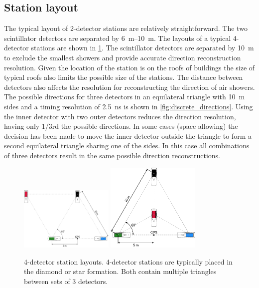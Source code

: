 \subsection{Station layout}
\label{sec:station_layout}

The typical layout of 2-detector stations are relatively straightforward. The two scintillator detectors are separated by \SIrange{6}{10}{\meter}. The layouts of a typical 4-detector stations are shown in \cref{fig:4_detector_layouts}. The scintillator detectors are separated by \SI{10}{\meter} to exclude the smallest showers and provide accurate direction reconstruction resolution. Given the location of the station is on the roofs of buildings the size of typical roofs also limits the possible size of the stations. The distance between detectors also affects the resolution for reconstructing the direction of air showers. The possible directions for three detectors in an equilateral triangle with \SI{10}{\meter} sides and a timing resolution of \SI{2.5}{\ns} is shown in \cref{fig:discrete_directions}. Using the inner detector with two outer detectors reduces the direction resolution, having only 1/3rd the possible directions. In some cases (space allowing) the decision has been made to move the inner detector outside the triangle to form a second equilateral triangle sharing one of the sides. In this case all combinations of three detectors result in the same possible direction reconstructions.

\begin{figure}
    \centering
    \includegraphics[width=0.4\textwidth]
                    {plots/station/4_detector_diamond}
    \includegraphics[width=0.4\textwidth]
                    {plots/station/4_detector_star}
    \caption{4-detector station layouts. 4-detector stations are typically placed in the diamond or star formation. Both contain multiple triangles between sets of 3 detectors.}
    \label{fig:4_detector_layouts}
\end{figure}

